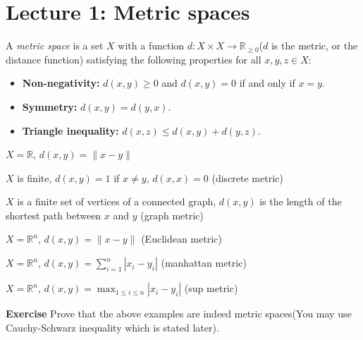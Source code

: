 \documentclass[main.tex]{subfiles}
\begin{document}
\pagestyle{plain}
\setcounter{chapter}{0}

\chapter{Lecture 1: Metric spaces}
\label{chap:chapter1}

\begin{definition}
    A \emph{metric space} is a set $X$ with a function $d: X \times X \to \mathbb{R}_{\ge 0}$($d$ is the metric, or the distance function) satisfying the following properties for all $x, y, z \in X$: 
    \begin{itemize}
    \item \textbf{Non-negativity:} $d(x, y) \ge 0$ and $d(x, y) = 0$ if and only if $x = y$.
    \item \textbf{Symmetry:} $d(x, y) = d(y, x)$.
    \item \textbf{Triangle inequality:} $d(x, z) \le d(x, y) + d(y, z)$. 
\end{itemize}
\end{definition}

\begin{example}
    $X = \mathbb{R}$, $d(x, y) = \|x - y\|$ 
\end{example}

\begin{example}
    $X$ is finite, $d(x, y) = 1$ if $x \neq y$, $d(x, x) = 0$ (discrete metric)
\end{example}

\begin{example}
    $X$ is a finite set of vertices of a connected graph, $d(x, y)$ is the length of the shortest path between $x$ and $y$ (graph metric)
\end{example}

\begin{example}
    $X = \mathbb{R}^n$, $d(x, y) = \|x - y\|$ (Euclidean metric) 
\end{example}

\begin{example}
    $X = \mathbb{R}^n$, $d(x, y) = \sum_{i=1}^n |x_i - y_i|$ (manhattan metric)
\end{example}

\begin{example}
    $X = \mathbb{R}^n$, $d(x, y) = \max_{1 \le i \le n} |x_i - y_i|$ (sup metric)
\end{example}

\par \noindent \textbf{Exercise} Prove that the above examples are indeed metric spaces(You may use Cauchy-Schwarz inequality which is stated later). 
\end{document}
